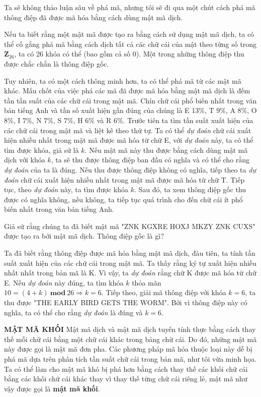Ta sẽ không thảo luận sâu về phá mã, nhưng tôi sẽ đi qua một chút cách
phá mã thông điệp đã được mã hóa bằng cách dùng mật mã dịch.

Nếu ta biết rằng một mật mã được tạo ra bằng cách sử dụng mật mã dịch,
ta có thể cố gắng phá mã bằng cách dịch tất cả các chữ cái của mật theo từng số trong $\mathbf{Z}_{26}$, ta có 26 khóa có thể (bao gồm cả số 0). Một trong những thông điệp thu được
chắc chắn là thông điệp gốc.

Tuy nhiên, ta có một cách
thông minh hơn, ta có thể phá mã từ các mật mã khác.
Mấu chốt của việc phá các mã đã được mã hóa bằng mật mã dịch là đếm tần tần suất
của các chữ cái trong mật mã. Chín chữ cái phổ biến nhất trong văn bản tiếng Anh
và tần số xuất hiện gần đúng của chúng là E 13\%, T 9\%, A 8\%, O 8\%, I 7\%, N
7\%, S 7\%, H 6\% và R 6\%.
Trước tiên ta tìm tần suất xuất hiện của các chữ cái trong mật mã và liệt kê theo thứ tự.
Ta có thể \textit{dự đoán} chữ cái xuất hiện nhiều nhất trong mật mã được mã hóa từ chữ E, với \textit{dự đoán} này, ta có thể tìm được khóa, giả sử là $k$.
Nếu mật mã này thu được bằng cách dùng mật mã dịch với khóa $k$, ta sẽ thu được thông điệp ban đầu có nghĩa và có thể cho rằng \textit{dự đoán} của ta là đúng.
Nếu thu được thông điệp không có nghĩa, tiếp theo ta \textit{dự đoán} chữ cái xuất hiện nhiều nhất trong mật mã được mã hóa từ chữ T. Tiếp tục, theo \textit{dự đoán} này, ta tìm được khóa $k$.
Sau đó, ta xem thông điệp gốc thu được có nghĩa không, nếu không, ta tiếp tục quá trình cho đến chữ cái ít phổ biến nhất trong văn bản tiếng Anh.

\begin{example}
    Giả sử rằng chúng ta đã biết mật mã "ZNK KGXRE HOXJ MKZY ZNK
    CUXS" được tạo ra bởi mật mã dịch. Thông điệp gốc là gì?
\end{example}
\begin{solution}
    Ta đã biết rằng thông điệp được mã hóa bằng
    mật mã dịch, đàu tiên, ta tính tần suất xuất hiện
    của các chữ cái trong mật mã. Ta thấy rằng ký tự xuất hiện nhiều nhất nhất trong
    bản mã là K. Vì vậy, ta \textit{dự đoán} rằng chữ K được mã hóa từ chữ E. Nếu \textit{dự đoán} này đúng, ta tìm khóa $k$ thỏa mãn
    $10 = (4+k)\ \mathbf{mod}\ 26  \Rightarrow k = 6$. Tiếp theo, giải mã thông điệp với khóa $k=6$, ta thu được "THE EARLY BIRD GETS THE WORM". Bởi vì thông điệp
    này có nghĩa, ta có thể cho rằng \textit{dự đoán} là đúng và $k=6$.
\end{solution}

\noindent \textcolor{Mycolor}{\textbf{MẬT MÃ KHỐI}} Mật mã dịch và mật mã
dịch tuyến tính thực bằng cách thay thế mỗi chữ cái
bằng một chữ cái khác trong bảng chữ cái. Do đó, những mật mã này được gọi là mật mã đơn pha.
Các phương pháp mã hóa thuộc loại này dễ bị phá mã dựa
trên phân tích tần suất chữ cái trong bản mã, như tôi vừa minh họa.
Ta có thể làm cho mật mã khó bị phá hơn bằng cách thay thế các
khối chữ cái bằng các khối chữ cái khác thay vì thay thế từng chữ cái riêng lẻ, mật mã như vậy được gọi là \textbf{mật mã khối}.